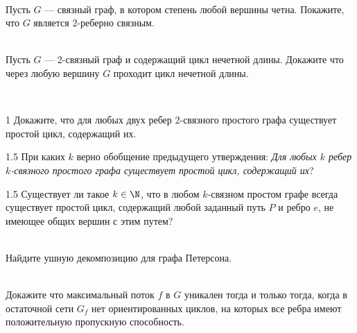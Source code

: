 \documentclass[a4paper,12pt,twoside]{article}
\begin{document}
\begin{?}[Разминочная]\ \\
     Пусть \(G\) --- связный граф, в котором степень любой вершины четна. Покажите, что \(G\) является 2-реберно связным.
\end{?}
\begin{?}\ \\
     Пусть \(G\) --- 2-связный граф и содержащий цикл нечетной длины. Докажите что через любую вершину \(G\) проходит цикл нечетной длины. 
\end{?}
\begin{?} \ 
    \begin{tasklist}
        \item[1] Докажите, что для любых двух ребер 2-связного простого графа существует простой цикл, содержащий их.
        \item[1.5] При каких \(k\) верно обобщение предыдущего утверждения: \textit{Для любых \(k\) ребер \(k\)-связного простого графа существует простой цикл, содержащий их}?
        \item[1.5] Существует ли такое \(k \in \N\), что в любом \(k\)-связном простом графе всегда существует простой цикл, содержащий любой заданный путь \(P\) и ребро \(e\), не имеющее общих вершин с этим путем?
    \end{tasklist}
\end{?}
\begin{?}\ \\
     Найдите ушную декомпозицию для графа Петерсона.
\end{?}
\begin{?}\ \\
     Докажите что максимальный поток \(f\) в \(G\) уникален тогда и только тогда, когда в остаточной сети \(G_f\) нет ориентированных циклов, на которых все ребра имеют положительную пропускную способность. 
\end{?}
\end{document}

